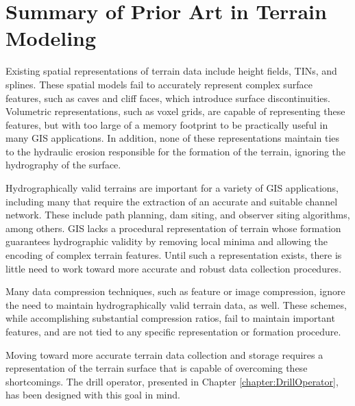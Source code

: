\section{Summary of Prior Art in Terrain Modeling}

Existing spatial representations of terrain data include height fields, TINs, 
and splines. These spatial models fail to accurately represent complex surface features, such as 
caves and cliff faces, which introduce surface discontinuities. 
% 
Volumetric representations, such as voxel grids, are capable of representing
these features, but with too large of a memory footprint to be practically
useful in many GIS applications. 
% 
In addition, none of these representations maintain ties to the hydraulic
erosion responsible for the formation of the terrain, ignoring the hydrography
of the surface.
% 

Hydrographically valid terrains are important for a variety of GIS applications, including many that require the extraction of an accurate and suitable channel network. These include path planning, dam siting, and observer siting algorithms, among others. GIS lacks a procedural representation of terrain whose formation guarantees hydrographic validity by removing local minima and allowing the encoding of complex terrain features.
Until such a representation exists, there is little need to work toward more accurate and robust data collection procedures.

Many data compression techniques, such as feature or image compression, ignore the need to maintain hydrographically valid terrain data, as well. These schemes, while accomplishing substantial compression ratios, fail to maintain important features, and are not tied to any specific representation or formation procedure.


Moving toward more accurate terrain data collection and storage requires
a representation of the terrain surface that is capable of overcoming these
shortcomings. 
% 
The drill operator, presented in Chapter \ref{chapter:DrillOperator},
has been designed with this goal in mind.









